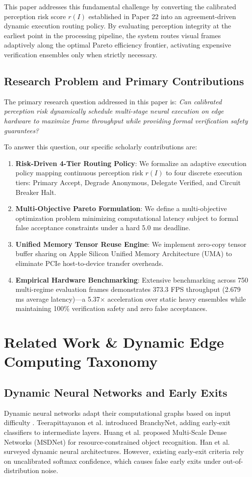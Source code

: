 \documentclass[conference]{IEEEtran}
\begin{document}
This paper addresses this fundamental challenge by converting the calibrated perception risk score $r(I)$ established in Paper 22 \cite{b5} into an agreement-driven dynamic execution routing policy. By evaluating perception integrity at the earliest point in the processing pipeline, the system routes visual frames adaptively along the optimal Pareto efficiency frontier, activating expensive verification ensembles only when strictly necessary.

\subsection{Research Problem and Primary Contributions}
The primary research question addressed in this paper is: \textit{Can calibrated perception risk dynamically schedule multi-stage neural execution on edge hardware to maximize frame throughput while providing formal verification safety guarantees?}

To answer this question, our specific scholarly contributions are:
\begin{enumerate}
    \item \textbf{Risk-Driven 4-Tier Routing Policy}: We formalize an adaptive execution policy mapping continuous perception risk $r(I)$ to four discrete execution tiers: Primary Accept, Degrade Anonymous, Delegate Verified, and Circuit Breaker Halt.
    \item \textbf{Multi-Objective Pareto Formulation}: We define a multi-objective optimization problem minimizing computational latency subject to formal false acceptance constraints under a hard 5.0 ms deadline.
    \item \textbf{Unified Memory Tensor Reuse Engine}: We implement zero-copy tensor buffer sharing on Apple Silicon Unified Memory Architecture (UMA) to eliminate PCIe host-to-device transfer overheads.
    \item \textbf{Empirical Hardware Benchmarking}: Extensive benchmarking across 750 multi-regime evaluation frames demonstrates 373.3 FPS throughput (2.679 ms average latency)—a 5.37$\times$ acceleration over static heavy ensembles while maintaining 100\% verification safety and zero false acceptances.
\end{enumerate}

\section{Related Work & Dynamic Edge Computing Taxonomy}
\subsection{Dynamic Neural Networks and Early Exits}
Dynamic neural networks adapt their computational graphs based on input difficulty \cite{b6, b7}. Teerapittayanon et al. \cite{b8} introduced BranchyNet, adding early-exit classifiers to intermediate layers. Huang et al. \cite{b9} proposed Multi-Scale Dense Networks (MSDNet) for resource-constrained object recognition. Han et al. \cite{b10} surveyed dynamic neural architectures. However, existing early-exit criteria rely on uncalibrated softmax confidence, which causes false early exits under out-of-distribution noise.
\end{document}
